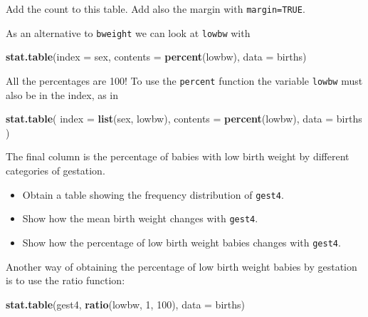 \documentclass[
]{book}
\newenvironment{Shaded}{\begin{snugshade}}{\end{snugshade}}
\newcommand{\AttributeTok}[1]{\textcolor[rgb]{0.13,0.29,0.53}{#1}}
\newcommand{\DecValTok}[1]{\textcolor[rgb]{0.00,0.00,0.81}{#1}}
\newcommand{\FunctionTok}[1]{\textcolor[rgb]{0.13,0.29,0.53}{\textbf{#1}}}
\newcommand{\NormalTok}[1]{#1}
\providecommand{\tightlist}{%
  \setlength{\itemsep}{0pt}\setlength{\parskip}{0pt}}
\begin{document}
Add the count to this table. Add also the margin with \texttt{margin=TRUE}.

As an alternative to \texttt{bweight} we can look at \texttt{lowbw} with

\begin{Shaded}
\begin{Highlighting}[]
\FunctionTok{stat.table}\NormalTok{(}\AttributeTok{index =}\NormalTok{ sex, }\AttributeTok{contents =} \FunctionTok{percent}\NormalTok{(lowbw), }\AttributeTok{data =}\NormalTok{ births)}
\end{Highlighting}
\end{Shaded}

All the percentages are 100! To use the \texttt{percent} function the variable \texttt{lowbw} must also be in the index, as in

\begin{Shaded}
\begin{Highlighting}[]
\FunctionTok{stat.table}\NormalTok{(}
  \AttributeTok{index =} \FunctionTok{list}\NormalTok{(sex, lowbw), }
  \AttributeTok{contents =} \FunctionTok{percent}\NormalTok{(lowbw), }
  \AttributeTok{data =}\NormalTok{ births}
\NormalTok{)}
\end{Highlighting}
\end{Shaded}

The final column is the percentage of babies with low birth weight by different categories of gestation.

\begin{itemize}
\tightlist
\item
  Obtain a table showing the frequency distribution of \texttt{gest4}.
\item
  Show how the mean birth weight changes with \texttt{gest4}.
\item
  Show how the percentage of low birth weight babies changes with \texttt{gest4}.
\end{itemize}

Another way of obtaining the percentage of low birth weight babies by
gestation is to use the ratio function:

\begin{Shaded}
\begin{Highlighting}[]
\FunctionTok{stat.table}\NormalTok{(gest4, }\FunctionTok{ratio}\NormalTok{(lowbw, }\DecValTok{1}\NormalTok{, }\DecValTok{100}\NormalTok{), }\AttributeTok{data =}\NormalTok{ births)}
\end{Highlighting}
\end{Shaded}
\end{document}
